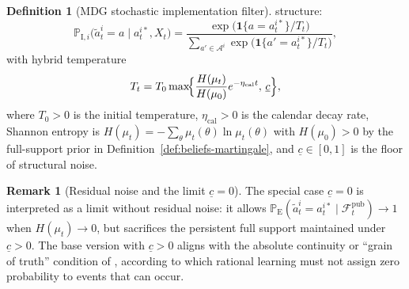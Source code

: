 \documentclass[12pt]{article}
\numberwithin{equation}{section}
\numberwithin{table}{section}
\theoremstyle{definition}
\newtheorem{definition}[theorem]{Definition}
\newtheorem{remark}[theorem]{Remark}
\newcommand{\ProbE}{\mathbb{P}_{\mathrm{E}}}
\newcommand{\ProbI}[1]{\mathbb{P}_{\mathrm{I},#1}}
\begin{document}
\begin{definition}[MDG stochastic implementation filter]
structure:
\begin{equation}
\label{eq:logit-hybrid}
\ProbI{i}\bigl(\tilde{a}_t^i=a\mid a_t^{i\ast},X_t\bigr)
=\frac{\exp\bigl(\mathbf{1}\{a=a_t^{i\ast}\}/T_t\bigr)}
      {\sum_{a'\in\mathcal{A}^i}\exp\bigl(\mathbf{1}\{a'=a_t^{i\ast}\}/T_t\bigr)},
\end{equation}
with hybrid temperature
\begin{equation}
\label{eq:temperatura-piso}
T_t = T_0\max\!\Bigl\{\frac{H(\mu_t)}{H(\mu_0)}e^{-\eta_{\mathrm{cal}}t},\,\underline{c}\Bigr\},
\end{equation}
where $T_0>0$ is the initial temperature, $\eta_{\mathrm{cal}}>0$ is the
calendar decay rate, Shannon entropy is
$H(\mu_t)=-\sum_\theta\mu_t(\theta)\ln\mu_t(\theta)$ with
$H(\mu_0)>0$ by the full-support prior in
Definition~\ref{def:beliefs-martingale}, and
$\underline{c}\in[0,1]$ is the floor of structural noise.
\end{definition}

\begin{remark}[Residual noise and the limit $\underline{c}=0$]
\label{rem:mdg-floor}
The special case $\underline{c}=0$ is interpreted as a limit without residual
noise: it allows
$\ProbE(\tilde{a}_t^i=a_t^{i\ast}\mid\mathcal{F}_t^{\mathrm{pub}})\to 1$
when $H(\mu_t)\to 0$, but sacrifices the persistent full support maintained
under $\underline{c}>0$. The base version with $\underline{c}>0$ aligns with
the absolute continuity or ``grain of truth'' condition of
\citet{KalaiLehrer1993}, according to which rational learning must not assign
zero probability to events that can occur.
\end{remark}
\end{document}
